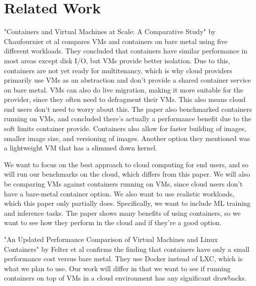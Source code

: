 \documentclass[11pt]{article}
\begin{document}
\section{Related Work}


"Containers and Virtual Machines at Scale: A Comparative Study" by Chaufournier et al compares VMs and containers on bare metal using five different workloads.
They concluded that containers have similar performance in most areas except disk I/O, but VMs provide better isolation.
Due to this, containers are not yet ready for multitenancy, which is why cloud providers primarily use VMs as an abstraction and don't provide a shared container service on bare metal. VMs can also do live migration, making it more suitable for the provider, since they often need to defragment their VMs.
This also means cloud end users don't need to worry about this. The paper also benchmarked containers running on VMs, and concluded there's actually a performance benefit due to the soft limits container provide. Containers also allow for faster building of images, smaller image size, and versioning of images. Another option they mentioned was a lightweight VM that has a slimmed down kernel.

We want to focus on the best approach to cloud computing for end users, and so will run our benchmarks on the cloud, which differs from this paper. We will also be comparing VMs against containers running on VMs, since cloud users don't have a bare-metal container option. We also want to use realistic workloads, which this paper only partially does. Specifically, we want to include ML training and inference tasks. The paper shows many benefits of using containers, so we want to see how they perform in the cloud and if they're a good option.

"An Updated Performance Comparison of Virtual Machines and Linux Containers" by Felter et al confirms the finding that containers have only a small performance cost versus bare metal. They use Docker instead of LXC, which is what we plan to use. Our work will differ in that we want to see if running containers on top of VMs in a cloud environment has any significant drawbacks.
\end{document}
